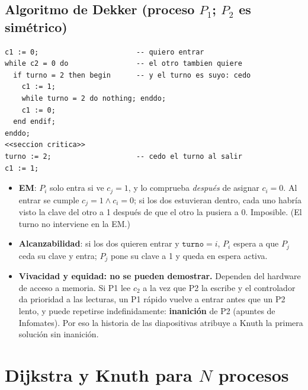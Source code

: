 \documentclass[11pt,a4paper,oneside]{report}
\begin{document}
\subsection{Algoritmo de Dekker (proceso $P_1$; $P_2$ es simétrico)}
\begin{lstlisting}
c1 := 0;                       -- quiero entrar
while c2 = 0 do                -- el otro tambien quiere
  if turno = 2 then begin      -- y el turno es suyo: cedo
    c1 := 1;
    while turno = 2 do nothing; enddo;
    c1 := 0;
  end endif;
enddo;
<<seccion critica>>
turno := 2;                    -- cedo el turno al salir
c1 := 1;
\end{lstlisting}
\begin{itemize}[leftmargin=*]
  \item \textbf{EM}: $P_i$ solo entra si ve $c_j = 1$, y lo comprueba \emph{después} de asignar $c_i = 0$.
        Al entrar se cumple $c_j = 1 \land c_i = 0$; si los dos estuvieran dentro, cada uno habría visto la clave
        del otro a 1 después de que el otro la pusiera a 0. Imposible. (El turno no interviene en la EM.)
  \item \textbf{Alcanzabilidad}: si los dos quieren entrar y $\texttt{turno} = i$, $P_i$ espera a que $P_j$ ceda su
        clave y entra; $P_j$ pone su clave a 1 y queda en espera activa.
  \item \textbf{Vivacidad y equidad: no se pueden demostrar.} Dependen del hardware de acceso a memoria. Si P1 lee
        $c_2$ a la vez que P2 la escribe y el controlador da prioridad a las lecturas, un P1 rápido vuelve a entrar
        antes que un P2 lento, y puede repetirse indefinidamente: \textbf{inanición} de P2 (apuntes de Infomates).
        Por eso la historia de las diapositivas atribuye a Knuth la primera solución sin inanición.
\end{itemize}

\section{Dijkstra y Knuth para $N$ procesos}
\end{document}
